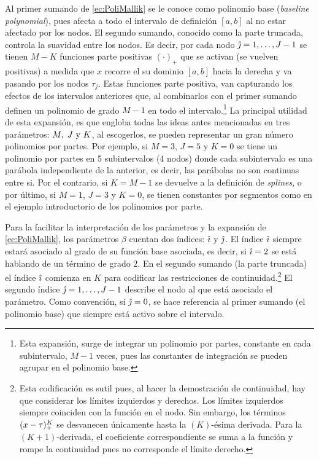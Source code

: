 \documentclass[../Main/Main.tex]{subfiles}
\begin{document}
Al primer sumando de \eqref{ec:PoliMallik} se le conoce como polinomio base (\textit{baseline polynomial}), pues afecta a todo el intervalo de definición $[a,b]$ al no estar afectado por los nodos. El segundo sumando, conocido como la parte truncada, controla la suavidad entre los nodos. Es decir, por cada nodo $\hat{\jmath} = 1,\ldots,J-1$ se tienen $M - K$ funciones parte positivas $(\cdot)_{+}$ que se activan (se vuelven positivas) a medida que $x$ recorre el su dominio $[a,b]$ hacia la derecha y va pasando por los nodos $\tau_j$. Estas funciones parte positiva, van capturando los efectos de los intervalos anteriores que, al combinarlos con el primer sumando definen un polinomio de grado $M - 1$ en todo el intervalo.\footnote{Esta expansión, surge de integrar un polinomio por partes, constante en cada subintervalo, $M-1$ veces, pues las constantes de integración se pueden agrupar en el polinomio base.} La principal utilidad de esta expansión, es que engloba todas las ideas antes mencionadas en tres parámetros: $M,\;J\text{ y }K$, al escogerlos, se pueden representar un gran número polinomios por partes. Por ejemplo, si $M = 3$, $J = 5$ y $K = 0$ se tiene un polinomio por partes en 5 subintervalos (4 nodos) donde cada subintervalo es una parábola independiente de la anterior, es decir, las parábolas no son continuas entre si. Por el contrario, si $K = M - 1$ se devuelve a la definición de \textit{splines}, o por último, si $M = 1$, $J = 3$ y $K = 0$, se tienen constantes por segmentos como en el ejemplo introductorio de los polinomios por parte.

Para la facilitar la interpretación de los parámetros y la expansión de \eqref{ec:PoliMallik}, los parámetros $\beta$ cuentan dos índices: $\hat{\imath}$ y $\hat{\jmath}$. El índice $\hat{\imath}$ siempre estará asociado al grado de su función base asociada, es decir, si $\hat{\imath} = 2$ se está hablando de un término de grado $2$. En el segundo sumando (la parte truncada) el índice $\hat{\imath}$ comienza en $K$ para codificar las restricciones de continuidad.\footnote{Esta codificación es sutil pues, al hacer la demostración de continuidad, hay que considerar los límites izquierdos y derechos. Los límites izquierdos siempre coinciden con la función en el nodo. Sin embargo, los términos $(x-\tau)^K_+$ se desvanecen únicamente hasta la $(K)$-ésima derivada. Para la $(K+1)$-derivada, el coeficiente correspondiente se suma a la función y rompe la continuidad pues no corresponde el límite derecho.} El segundo índice $\hat{\jmath} = 1,\ldots, J-1$ describe el nodo al que está asociado el parámetro. Como convención, si $\hat{\jmath} = 0$, se hace referencia al primer sumando (el polinomio base) que siempre está activo sobre el intervalo. 
\end{document}
